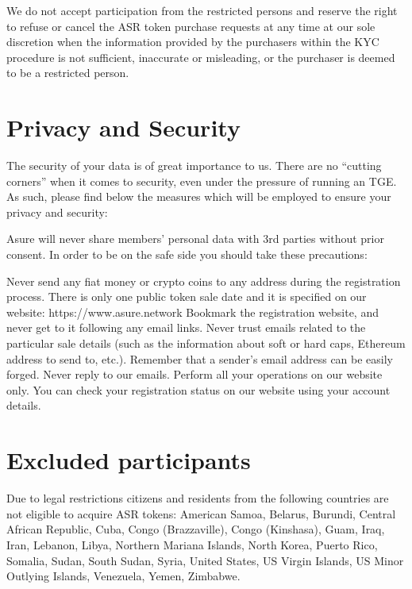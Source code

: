 We do not accept participation from the restricted persons and reserve the right to refuse or cancel the ASR token purchase requests at any time at our sole discretion when the information provided by the purchasers within the KYC procedure is not sufficient, inaccurate or misleading, or the purchaser is deemed to be a restricted person.

\section{Privacy and Security}
The security of your data is of great importance to us. There are no “cutting corners” when it comes to security, even under the pressure of running an TGE.  As such, please find below the measures which will be employed to ensure your privacy and security:

Asure will never share members’ personal data with 3rd parties without prior consent. In order to be on the safe side you should take these precautions:

Never send any fiat money or crypto coins to any address during the registration process. There is only one public token sale date and it is specified on our website: https://www.asure.network Bookmark the registration website, and never get to it following any email links.
Never trust emails related to the particular sale details (such as the information about soft or hard caps, Ethereum address to send to, etc.). Remember that a sender’s email address can be easily forged.
Never reply to our emails. Perform all your operations on our website only. You can check your registration status on our website using your account details.


\section{Excluded participants}
Due to legal restrictions citizens and residents from the following countries are not eligible to acquire ASR tokens: American Samoa, Belarus, Burundi, Central African Republic, Cuba, Congo (Brazzaville), Congo (Kinshasa), Guam, Iraq, Iran, Lebanon, Libya, Northern Mariana Islands, North Korea, Puerto Rico, Somalia, Sudan, South Sudan, Syria, United States, US Virgin Islands, US Minor Outlying Islands, Venezuela, Yemen, Zimbabwe.
